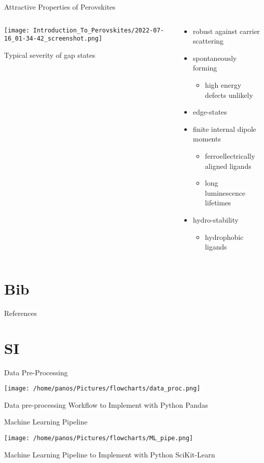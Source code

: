 \documentclass[10pt, compress, aspectratio=169]{beamer}
\begin{document}
\begin{frame}[label={sec:org580ee3e}]{Attractive Properties of Perovskites}
\begin{columns}
\begin{column}{0.5\columnwidth}
\begin{center}
\texttt{[image: Introduction\_To\_Perovskites/2022-07-16\_01-34-42\_screenshot.png]}
\end{center}
Typical severity of gap states\autocite{mannodi-kanakkithodi-2020-defec-energ}
\end{column}
\begin{column}{0.5\columnwidth}
\begin{itemize}
\item robust against carrier scattering\autocite{yan-2016-defec-physic}
\item spontaneously forming
\begin{itemize}
\item high energy defects unlikely
\end{itemize}
\item edge-states
\item finite internal dipole moments\autocite{hong-2021-layer-edge}
\begin{itemize}
\item ferroellectrically aligned ligands
\item long luminescence lifetimes
\end{itemize}
\item hydro-stability\autocite{fu-2021-two-dimen}
\begin{itemize}
\item hydrophobic ligands
\end{itemize}
\end{itemize}
\end{column}
\end{columns}
\end{frame}

\section{Bib}
\label{sec:org7625965}
\begin{frame}[label={sec:org57aa444}]{References}
\AtNextBibliography{\tiny}
\printbibliography
\end{frame}
\section{SI}
\label{sec:org406cbf8}
\begin{frame}[label={sec:org92bfff7}]{Data Pre-Processing}
\begin{center}
\texttt{[image: /home/panos/Pictures/flowcharts/data\_proc.png]}
\end{center}
Data pre-processing Workflow to Implement with Python Pandas
\end{frame}
\begin{frame}[label={sec:org296e1f8}]{Machine Learning Pipeline}
\begin{center}
\texttt{[image: /home/panos/Pictures/flowcharts/ML\_pipe.png]}
\end{center}
Machine Learning Pipeline to Implement with Python SciKit-Learn
\end{frame}
\end{document}
